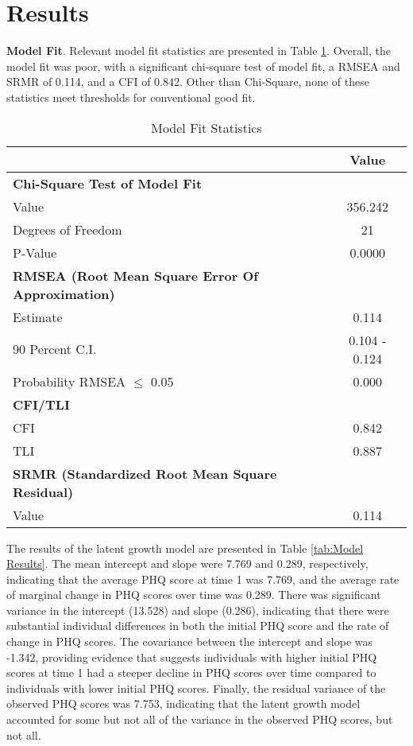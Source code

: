 \documentclass[11pt]{article}
\begin{document}
\section{Results}

\textbf{Model Fit}. Relevant model fit statistics are presented in Table \ref{tab:Model Fit}. Overall, the model fit was poor, with a significant chi-square test of model fit, a RMSEA and SRMR of 0.114, and a CFI of 0.842. Other than Chi-Square, none of these statistics meet thresholds for conventional good fit. 

\begin{table}[htbp!]
    \centering
    \caption{Model Fit Statistics} \label{tab:Model Fit}
    \begin{tabular}{l c}
    \toprule
    & \textbf{Value} \\
    \midrule
    \textbf{Chi-Square Test of Model Fit} & \\
    Value & 356.242 \\
    Degrees of Freedom & 21 \\
    P-Value & 0.0000 \\
    \midrule
    \textbf{RMSEA (Root Mean Square Error Of Approximation)} & \\
    Estimate & 0.114 \\
    90 Percent C.I. & 0.104 - 0.124 \\
    Probability RMSEA $\leq$ 0.05 & 0.000 \\
    \midrule
    \textbf{CFI/TLI} & \\
    CFI & 0.842 \\
    TLI & 0.887 \\
    \midrule
    \textbf{SRMR (Standardized Root Mean Square Residual)} & \\
    Value & 0.114 \\
    \bottomrule
    \end{tabular}
\end{table}

The results of the latent growth model are presented in Table \ref{tab:Model Results}. 
The mean intercept and slope were 7.769 and 0.289, respectively, indicating that the average PHQ score at time 1 was 7.769, and the average rate of marginal change in PHQ scores over time was 0.289. 
There was significant variance in the intercept (13.528) and slope (0.286), indicating that there were substantial individual differences in both the initial PHQ score and the rate of change in PHQ scores. 
The covariance between the intercept and slope was -1.342, providing evidence that suggests individuals with higher initial PHQ scores at time 1 had a steeper decline in PHQ scores over time compared to individuals with lower initial PHQ scores.
Finally, the residual variance of the observed PHQ scores was 7.753, indicating that the latent growth model accounted for some but not all of the variance in the observed PHQ scores, but not all.
\end{document}
